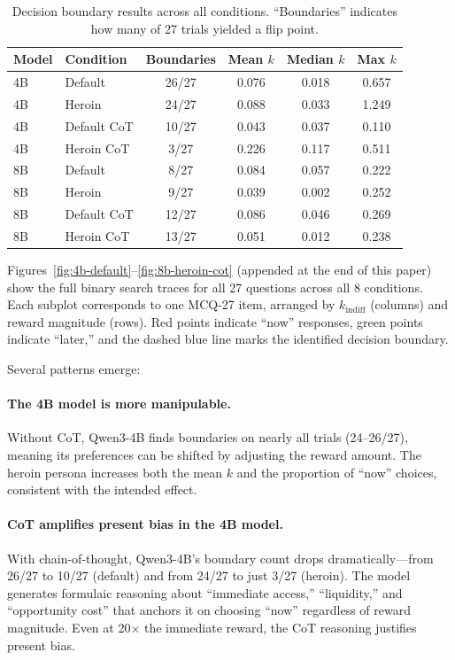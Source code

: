 \documentclass[11pt,a4paper]{article}
\begin{document}
\begin{table}[H]
\centering
\caption{Decision boundary results across all conditions. ``Boundaries'' indicates how many of 27 trials yielded a flip point.}
\label{tab:boundary}
\begin{tabular}{llcccc}
\toprule
\textbf{Model} & \textbf{Condition} & \textbf{Boundaries} & \textbf{Mean $k$} & \textbf{Median $k$} & \textbf{Max $k$} \\
\midrule
4B & Default & 26/27 & 0.076 & 0.018 & 0.657 \\
4B & Heroin & 24/27 & 0.088 & 0.033 & 1.249 \\
4B & Default CoT & 10/27 & 0.043 & 0.037 & 0.110 \\
4B & Heroin CoT & 3/27 & 0.226 & 0.117 & 0.511 \\
\midrule
8B & Default & 8/27 & 0.084 & 0.057 & 0.222 \\
8B & Heroin & 9/27 & 0.039 & 0.002 & 0.252 \\
8B & Default CoT & 12/27 & 0.086 & 0.046 & 0.269 \\
8B & Heroin CoT & 13/27 & 0.051 & 0.012 & 0.238 \\
\bottomrule
\end{tabular}
\end{table}

Figures~\ref{fig:4b-default}--\ref{fig:8b-heroin-cot} (appended at the end of this paper) show the full binary search traces for all 27 questions across all 8 conditions. Each subplot corresponds to one MCQ-27 item, arranged by $k_{\text{indiff}}$ (columns) and reward magnitude (rows). Red points indicate ``now'' responses, green points indicate ``later,'' and the dashed blue line marks the identified decision boundary.

Several patterns emerge:

\paragraph{The 4B model is more manipulable.} Without CoT, Qwen3-4B finds boundaries on nearly all trials (24--26/27), meaning its preferences can be shifted by adjusting the reward amount. The heroin persona increases both the mean $k$ and the proportion of ``now'' choices, consistent with the intended effect.

\paragraph{CoT amplifies present bias in the 4B model.} With chain-of-thought, Qwen3-4B's boundary count drops dramatically---from 26/27 to 10/27 (default) and from 24/27 to just 3/27 (heroin). The model generates formulaic reasoning about ``immediate access,'' ``liquidity,'' and ``opportunity cost'' that anchors it on choosing ``now'' regardless of reward magnitude. Even at 20$\times$ the immediate reward, the CoT reasoning justifies present bias.
\end{document}
